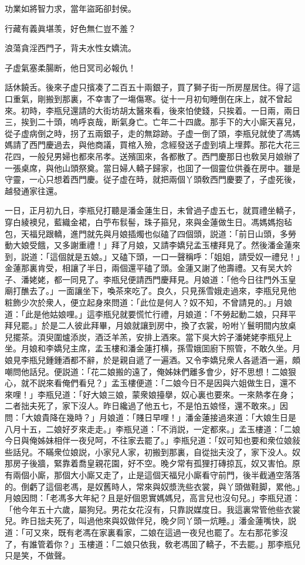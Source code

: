 功業如將智力求，當年盜跖卻封侯。

行藏有義眞堪羡，好色無仁豈不羞？

浪蕩貪淫西門子，背夫水性女嬌流。

子虚氣塞柔腸断，他日冥司必報仇！

話休饒舌。後來子虚只擯凑了二百五十兩銀子，買了獅子街一所房屋居住。得了這口重氣，剛搬到那裏，不幸害了一塲傷寒。従十一月初旬睡倒在床上，就不曾起來。初時，李瓶兒還請的大街坊胡太醫來看，後來怕使錢，只挨着。一日兩，兩日三，挨到二十頭，嗚呼哀哉，断氣身亡。亡年二十四歲。那手下的大小廝天喜兒，從子虚病倒之時，拐了五兩銀子，走的無踪跡。子虚一倒了頭，李瓶兒就使了馮媽媽請了西門慶過去，與他商議，買棺入殮，念經發送子虚到墳上埋葬。那花大花三花四，一般兒男婦也都來吊孝。送殯囬來，各都散了。西門慶那日也敎吴月娘辦了一張桌席，與他山頭祭奠。當日婦人轎子歸家，也囬了一個靈位供養在房中。雖是守靈，一心只想着西門慶。従子虚在時，就把兩個丫頭敎西門慶要了，子虚死後，越發通家往還。

一日，正月初九日，李瓶兒打聽是潘金蓮生日，未曾過子虚五七，就買禮坐轎子，穿白綾襖兒，藍織金裙，白苧布䯼髻，珠子箍兒，來與金蓮做生日。馮媽媽抱毡包，天福兒跟轎，進門就先與月娘插燭也似磕了四個頭，説道：「前日山頭，多勞動大娘受餓，又多謝重禮！」拜了月娘，又請李嬌兒孟玉樓拜見了。然後潘金蓮來到，説道：「這個就是五娘。」又磕下頭，一口一聲稱呼：「姐姐，請受奴一禮兒！」金蓮那裏肯受，相讓了半日，兩個還平磕了頭。金蓮又謝了他壽禮。又有吴大妗子、潘姥姥，都一同見了。李瓶兒便請西門慶拜見。月娘道：「他今日往門外玉皇廟打醮去了。」一面讓坐下，喚茶來吃了。良久，只見孫雪娥走過來，李瓶兒見他粧飾少次於衆人，便立起身來問道：「此位是何人？奴不知，不曾請見的。」月娘道：「此是他姑娘哩。」這李瓶兒就要慌忙行禮，月娘道：「不勞起動二娘，只拜平拜兒罷。」於是二人彼此拜畢，月娘就讓到房中，換了衣裳，吩咐丫鬟明間内放桌兒擺茶。湏臾圍爐添炭，酒泛羊羔，安排上酒來。當下吳大妗子潘姥姥李瓶兒上坐。月娘和李嬌兒主席，孟玉樓和潘金蓮打横，孫雪娥囬廚下照管，不敢久坐。月娘見李瓶兒鍾鍾酒都不辭，於是親自遞了一遍酒。又令李嬌兒衆人各遞酒一遍，頗嘲問他話兒。便説道：「花二娘搬的遠了，俺姊妹們離多會少，好不思想！二娘狠心，就不説來看俺們看兒？」孟玉樓便道：「二娘今日不是因與六姐做生日，還不來哩！」李瓶兒道：「好大娘三娘，蒙衆娘擡擧，奴心裏也要來。一來熱孝在身；二者拙夫死了，家下沒人。昨日纔過了他五七，不是怕五娘怪，還不敢來。」因問：「大娘貴降在幾時？」月娘道：「賤日早哩！」潘金蓮接過來道：「大娘生日是八月十五，二娘好歹來走走。」李瓶兒道：「不消説，一定都來。」孟玉樓道：「二娘今日與俺姊妹相伴一夜兒呵，不往家去罷了。」李瓶兒道：「奴可知也要和衆位娘敍些話兒。不瞞衆位娘説，小家兒人家，初搬到那裏，自從拙夫没了，家下没人。奴那房子後牆，緊靠着喬皇親花園，好不空。晚夕常有孤狸打磚掠瓦，奴又害怕。原有兩個小廝，那個大小廝又走了，止是這個天福兒小廝看守前門，後半截通空落落的。倒虧了這個老馮，是奴舊時人，常來與奴漿洗些衣裳，與丫頭做鞋脚，累他。」月娘因問：「老馮多大年紀？且是好個恩實媽媽兒，高言兒也沒句兒。」李瓶兒道：「他今年五十六歲，屬狗兒。男花女花沒有，只靠説媒度日。我這裏常管他些衣裳兒。昨日拙夫死了，叫過他來與奴做伴兒，晚夕同丫頭一炕睡。」潘金蓮嘴快，説道：「可又來，既有老馮在家裏看家，二娘在這過一夜兒也罷了。左右那花爹沒了，有誰管着你？」玉樓道：「二娘只依我，敎老馮囬了轎子，不去罷。」那李瓶兒只是笑，不做聲。

